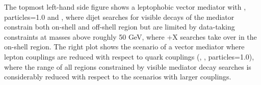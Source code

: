 The topmost left-hand side figure shows a leptophobic vector mediator with , \ginvisible particles=1.0 and , where dijet searches for visible decays of the mediator constrain both on-shell and off-shell region but are limited by data-taking constraints at masses above roughly 50 GeV, where \MET+X searches take over in the on-shell region. 
The right plot shows the scenario of a vector mediator where lepton couplings are reduced with respect to quark couplings (, , \ginvisible particles=1.0), where the range of all regions constrained by visible mediator decay searches is considerably reduced with respect to the scenarios with larger couplings. 

